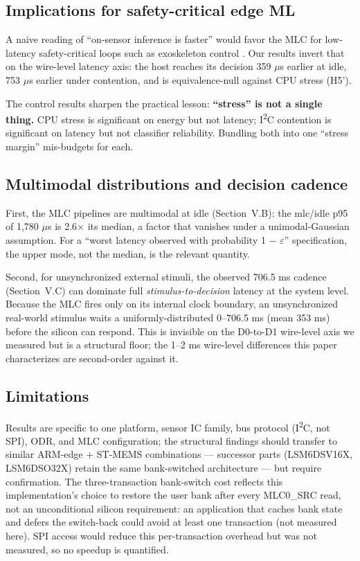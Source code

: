 \subsection{Implications for safety-critical edge ML}

A naive reading of ``on-sensor inference is faster'' would favor the MLC for low-latency safety-critical loops such as exoskeleton control \cite{ref3}. Our results invert that on the wire-level latency axis: the host reaches its decision 359 $\mu$s earlier at idle, 753 $\mu$s earlier under contention, and is equivalence-null against CPU stress (H5').

The control results sharpen the practical lesson: \textbf{``stress'' is not a single thing.} CPU stress is significant on energy but not latency; I\textsuperscript{2}C contention is significant on latency but not classifier reliability. Bundling both into one ``stress margin'' mis-budgets for each.

\subsection{Multimodal distributions and decision cadence}

First, the MLC pipelines are multimodal at idle (Section~V.B): the mlc/idle p95 of 1,780 $\mu$s is 2.6$\times$ its median, a factor that vanishes under a unimodal-Gaussian assumption. For a ``worst latency observed with probability 1 $-$ $\varepsilon$'' specification, the upper mode, not the median, is the relevant quantity.

Second, for unsynchronized external stimuli, the observed 706.5 ms cadence (Section~V.C) can dominate full \emph{stimulus-to-decision} latency at the system level. Because the MLC fires only on its internal clock boundary, an unsynchronized real-world stimulus waits a uniformly-distributed 0--706.5 ms (mean 353 ms) before the silicon can respond. This is invisible on the D0-to-D1 wire-level axis we measured but is a structural floor; the 1--2 ms wire-level differences this paper characterizes are second-order against it.

\subsection{Limitations}

Results are specific to one platform, sensor IC family, bus protocol (I\textsuperscript{2}C, not SPI), ODR, and MLC configuration; the structural findings should transfer to similar ARM-edge + ST-MEMS combinations --- successor parts (LSM6DSV16X, LSM6DSO32X) retain the same bank-switched architecture --- but require confirmation. The three-transaction bank-switch cost reflects this implementation's choice to restore the user bank after every MLC0\_SRC read, not an unconditional silicon requirement: an application that caches bank state and defers the switch-back could avoid at least one transaction (not measured here). SPI access would reduce this per-transaction overhead but was not measured, so no speedup is quantified.

